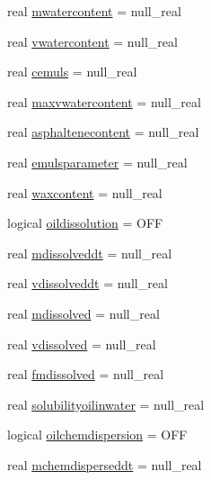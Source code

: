 \begin{DoxyCompactItemize}
\item 
real \mbox{\hyperlink{structmoduleoil_1_1t__var_af580a9c3d980c07680342e276a6cbe28}{mwatercontent}} = null\+\_\+real
\item 
real \mbox{\hyperlink{structmoduleoil_1_1t__var_ad87d5c79e2e2cc12dc5c0096b5c9c92a}{vwatercontent}} = null\+\_\+real
\item 
real \mbox{\hyperlink{structmoduleoil_1_1t__var_aed30d5a080b4905c0ec4feeb82dea472}{cemuls}} = null\+\_\+real
\item 
real \mbox{\hyperlink{structmoduleoil_1_1t__var_ae29f01f8a39bd8559decce33434f70ed}{maxvwatercontent}} = null\+\_\+real
\item 
real \mbox{\hyperlink{structmoduleoil_1_1t__var_a7b533b9a6978ce4ce7e669320470edd8}{asphaltenecontent}} = null\+\_\+real
\item 
real \mbox{\hyperlink{structmoduleoil_1_1t__var_a35632aa09f32445718c8346cf72055e9}{emulsparameter}} = null\+\_\+real
\item 
real \mbox{\hyperlink{structmoduleoil_1_1t__var_a4a5a9e4f5634020fc0b033d5c99ad16a}{waxcontent}} = null\+\_\+real
\item 
logical \mbox{\hyperlink{structmoduleoil_1_1t__var_af6b0b42d0f2493face1b09b28ac9a2e8}{oildissolution}} = O\+FF
\item 
real \mbox{\hyperlink{structmoduleoil_1_1t__var_aed41041404889ca1cdc41a2f3b10a27f}{mdissolveddt}} = null\+\_\+real
\item 
real \mbox{\hyperlink{structmoduleoil_1_1t__var_a8f313ff568c5a9a9c6af9439fd1d3b65}{vdissolveddt}} = null\+\_\+real
\item 
real \mbox{\hyperlink{structmoduleoil_1_1t__var_a634ae575d4f1768af3f7fecd25b44302}{mdissolved}} = null\+\_\+real
\item 
real \mbox{\hyperlink{structmoduleoil_1_1t__var_a503331fbd8d353015fdac3aac62ea611}{vdissolved}} = null\+\_\+real
\item 
real \mbox{\hyperlink{structmoduleoil_1_1t__var_a30bdd551322394fa17fb38eceb6a0759}{fmdissolved}} = null\+\_\+real
\item 
real \mbox{\hyperlink{structmoduleoil_1_1t__var_aa259527b490bea9425c09a19df3cfa45}{solubilityoilinwater}} = null\+\_\+real
\item 
logical \mbox{\hyperlink{structmoduleoil_1_1t__var_a15c316accfeb20dddc8c442f6f9d0d4a}{oilchemdispersion}} = O\+FF
\item 
real \mbox{\hyperlink{structmoduleoil_1_1t__var_a8d56f96e9d9a5dfebe46c0af8d0b165b}{mchemdisperseddt}} = null\+\_\+real
\item 

\end{DoxyCompactItemize}
